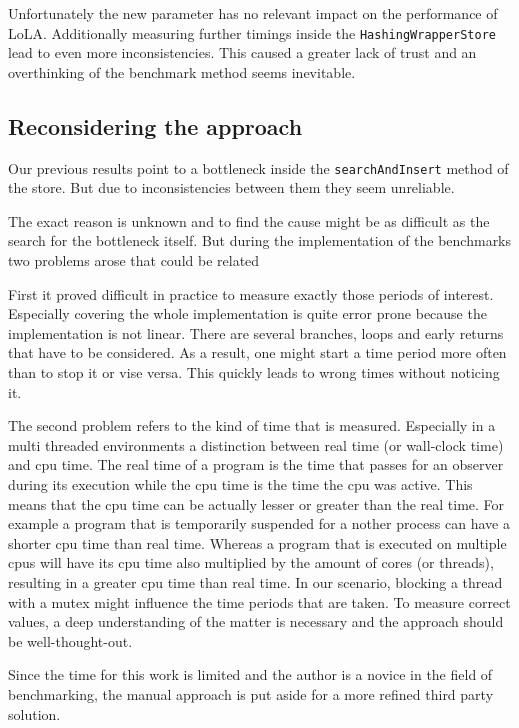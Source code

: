 Unfortunately the new parameter has no relevant impact on the performance of LoLA. Additionally measuring further timings inside the \texttt{HashingWrapperStore} lead to even more inconsistencies. This caused a greater lack of trust and an overthinking of the benchmark method seems inevitable.

\subsection{Reconsidering the approach}
Our previous results point to a bottleneck inside the \texttt{searchAndInsert} method of the store. But due to inconsistencies between them they seem unreliable.

The exact reason is unknown and to find the cause might be as difficult as the search for the bottleneck itself. But during the implementation of the benchmarks two problems arose that could be related

First it proved difficult in practice to measure exactly those periods of interest. Especially covering the whole implementation is quite error prone because the implementation is not linear. There are several branches, loops and early returns that have to be considered. As a result, one might start a time period more often than to stop it or vise versa. This quickly leads to wrong times without noticing it.

The second problem refers to the kind of time that is measured. Especially in a multi threaded environments a distinction between real time (or wall-clock time) and cpu time. The real time of a program is the time that passes for an observer during its execution while the cpu time is the time the cpu was active. This means that the cpu time can be actually lesser or greater than the real time. For example a program that is temporarily suspended for a nother process can have a shorter cpu time than real time. Whereas a program that is executed on multiple cpus will have its cpu time also multiplied by the amount of cores (or threads), resulting in a greater cpu time than real time. In our scenario, blocking a thread with a mutex might influence the time periods that are taken. To measure correct values, a deep understanding of the matter is necessary and the approach should be well-thought-out.

Since the time for this work is limited and the author is a novice in the field of benchmarking, the manual approach is put aside for a more refined third party solution.

